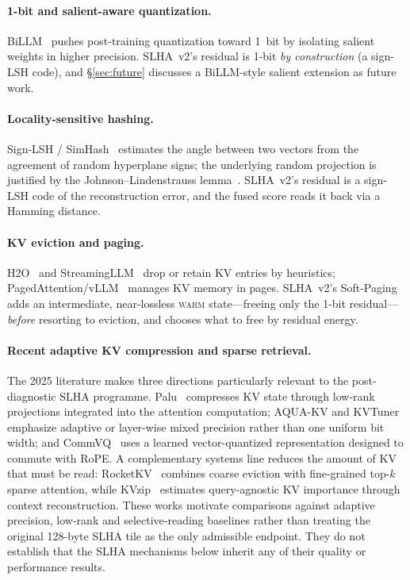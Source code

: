\documentclass[11pt]{article}
\newenvironment{addedblock}{\begingroup\color{revisionblue}}{\endgroup}
\theoremstyle{plain}
\theoremstyle{definition}
\begin{document}
\paragraph{1-bit and salient-aware quantization.}
BiLLM~\cite{billm} pushes post-training quantization toward 1~bit by
isolating salient weights in higher precision. SLHA~v2's residual is
1-bit \emph{by construction} (a sign-LSH code), and \S\ref{sec:future}
discusses a BiLLM-style salient extension as future work.

\paragraph{Locality-sensitive hashing.}
Sign-LSH / SimHash~\cite{charikar} estimates the angle between two
vectors from the agreement of random hyperplane signs; the underlying
random projection is justified by the Johnson--Lindenstrauss
lemma~\cite{jl}. SLHA~v2's residual is a sign-LSH code of the
reconstruction error, and the fused score reads it back via a Hamming
distance.

\paragraph{KV eviction and paging.}
H2O~\cite{h2o} and StreamingLLM~\cite{streamingllm} drop or retain KV
entries by heuristics; PagedAttention/vLLM~\cite{vllm} manages KV memory
in pages. SLHA~v2's Soft-Paging adds an intermediate, near-lossless
\textsc{warm} state---freeing only the 1-bit residual---\emph{before}
resorting to eviction, and chooses what to free by residual energy.
\begin{addedblock}
\paragraph{Recent adaptive KV compression and sparse retrieval.}
The 2025 literature makes three directions particularly relevant to the
post-diagnostic SLHA programme. Palu~\cite{palu} compresses KV state through
low-rank projections integrated into the attention computation; AQUA-KV
\cite{aquakv} and KVTuner~\cite{kvtuner} emphasize adaptive or layer-wise
mixed precision rather than one uniform bit width; and CommVQ~\cite{commvq}
uses a learned vector-quantized representation designed to commute with RoPE.
A complementary systems line reduces the amount of KV that must be read:
RocketKV~\cite{rocketkv} combines coarse eviction with fine-grained top-$k$
sparse attention, while KVzip~\cite{kvzip} estimates query-agnostic KV
importance through context reconstruction. These works motivate comparisons
against adaptive precision, low-rank and selective-reading baselines rather
than treating the original 128-byte SLHA tile as the only admissible endpoint.
They do not establish that the SLHA mechanisms below inherit any of their
quality or performance results.
\end{addedblock}
\end{document}

